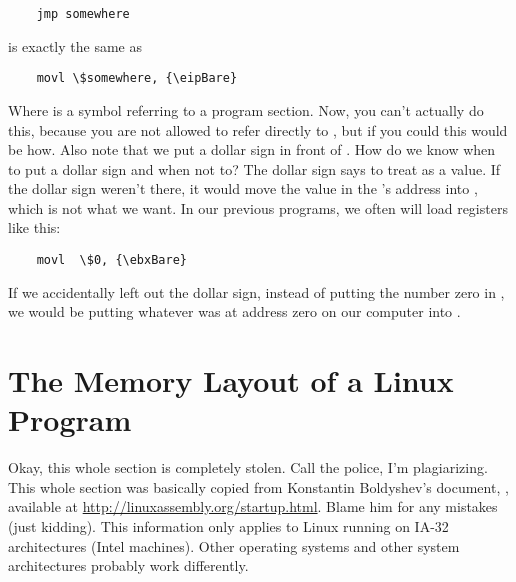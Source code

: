\begin{simpletyping}
\begin{lstlisting}
	jmp somewhere
\end{lstlisting}
\end{simpletyping}

is exactly the same as

\begin{simpletyping}
\begin{lstlisting}
	movl \$somewhere, {\eipBare}
\end{lstlisting}
\end{simpletyping}

Where  is a symbol referring to a program
section.  Now, you can't actually do this, because you are not
allowed to refer directly to \icode{{\eipBare}}, but if you
could this would be how.  Also note that we put a dollar sign
in front of .  How do we know when to
put a dollar sign and when not to?  The dollar sign says to treat
 as a value.  If the dollar sign weren't
there, it would move the value in the 's
address into \icode{{\eipBare}}, which is not what we want.
In our previous programs, we often will load registers like this:

\begin{simpletyping}
\begin{lstlisting}
	movl  \$0, {\ebxBare}
\end{lstlisting}
\end{simpletyping}

If we accidentally left out the dollar sign, instead of putting the
number zero in \icode{{\ebxBare}}, we would be putting whatever
was at address zero on our computer into \icode{{\ebxBare}}.

\section{The Memory Layout of a Linux Program}

Okay, this whole section is completely stolen.  Call the police, I'm
plagiarizing.  This whole section was
basically copied from Konstantin Boldyshev's document, , available at 
\url{http://linuxassembly.org/startup.html}.
Blame him for any mistakes (just kidding).  This information only applies
to Linux running on IA-32 architectures (Intel machines).   Other
operating systems and other system architectures probably work
differently.

